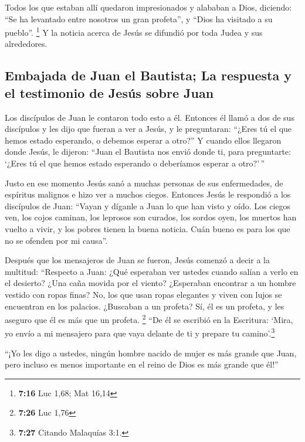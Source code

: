  Todos los que estaban allí quedaron impresionados y
alababan a Dios, diciendo: ``Se ha levantado entre nosotros un gran
profeta'', y ``Dios ha visitado a su pueblo''. \footnote{\textbf{7:16}
  Luc 1,68; Mat 16,14}  Y la noticia acerca de Jesús se
difundió por toda Judea y sus alrededores.

\hypertarget{embajada-de-juan-el-bautista-la-respuesta-y-el-testimonio-de-jesuxfas-sobre-juan}{%
\subsection{Embajada de Juan el Bautista; La respuesta y el testimonio
de Jesús sobre
Juan}\label{embajada-de-juan-el-bautista-la-respuesta-y-el-testimonio-de-jesuxfas-sobre-juan}}

 Los discípulos de Juan le contaron todo esto a él.
 Entonces él llamó a dos de sus discípulos y les dijo que
fueran a ver a Jesús, y le preguntaran: ``¿Eres tú el que hemos estado
esperando, o debemos esperar a otro?''  Y cuando ellos
llegaron donde Jesús, le dijeron: ``Juan el Bautista nos envió donde ti,
para preguntarte: `¿Eres tú el que hemos estado esperando o deberíamos
esperar a otro?'\,''

 Justo en ese momento Jesús sanó a muchas personas de sus
enfermedades, de espíritus malignos e hizo ver a muchos ciegos.
 Entonces Jesús le respondió a los discípulos de Juan:
``Vayan y díganle a Juan lo que han visto y oído. Los ciegos ven, los
cojos caminan, los leprosos son curados, los sordos oyen, los muertos
han vuelto a vivir, y los pobres tienen la buena noticia.
 Cuán bueno es para los que no se ofenden por mi causa''.

 Después que los mensajeros de Juan se fueron, Jesús
comenzó a decir a la multitud: ``Respecto a Juan: ¿Qué esperaban ver
ustedes cuando salían a verlo en el desierto? ¿Una caña movida por el
viento?  ¿Esperaban encontrar a un hombre vestido con
ropas finas? No, los que usan ropas elegantes y viven con lujos se
encuentran en los palacios.  ¿Buscaban a un profeta? Sí,
él es un profeta, y les aseguro que él es más que un profeta.
\footnote{\textbf{7:26} Luc 1,76}  ``De él se escribió en
la Escritura: `Mira, yo envío a mi mensajero para que vaya delante de ti
y prepare tu camino'.\footnote{\textbf{7:27} Citando Malaquías 3:1.}

 ``¡Yo les digo a ustedes, ningún hombre nacido de mujer
es más grande que Juan, pero incluso es menos importante en el reino de
Dios es más grande que él!''

